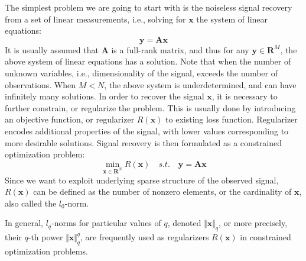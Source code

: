 \documentclass[journal]{IEEEtran}
\begin{document}
The simplest problem we are going to start with is the noiseless signal recovery from a set of linear measurements, i.e., solving for $\boldsymbol{x}$ the system of linear equations:
%
\begin{equation}
\boldsymbol{y}=\boldsymbol{A} \boldsymbol{x}
\end{equation}
%
It is usually assumed that $\boldsymbol{A}$ is a full-rank matrix, and thus for any $\boldsymbol{y}\in\mathbf{R}^M$, the above system of linear equations has a solution. Note that when the number of unknown variables, i.e., dimensionality of the signal, exceeds the number of observations. When $M<N$, the above system is underdetermined, and can have infinitely many solutions. In order to recover the signal $\boldsymbol{x}$, it is necessary to further constrain, or regularize the problem. This is usually done by introducing an objective function, or regularizer $R(\boldsymbol{x})$ to existing loss function. Regularizer encodes additional properties of the signal, with lower values corresponding to more desirable solutions. Signal recovery is then formulated as a constrained optimization problem:
%
\begin{equation}
\min\limits_{\boldsymbol{x}\in\mathbf{R}^N} R(\boldsymbol{x})\quad s.t.\quad \boldsymbol{y}=\boldsymbol{A}\boldsymbol{x}
\end{equation}
%
Since we want to exploit underlying sparse structure of the observed signal, $R(\boldsymbol{x})$ can be defined as the number of nonzero elements, or the cardinality of $\boldsymbol{x}$, also called the $l_0$-norm.

In general, $l_q$-norms for particular values of $q$, denoted $\Vert \boldsymbol{x}\Vert_q$, or more precisely, their $q$-th power $\Vert \boldsymbol{x}\Vert_q^q$, are frequently used as regularizers $R(\boldsymbol{x})$ in constrained optimization problems.
\end{document}
